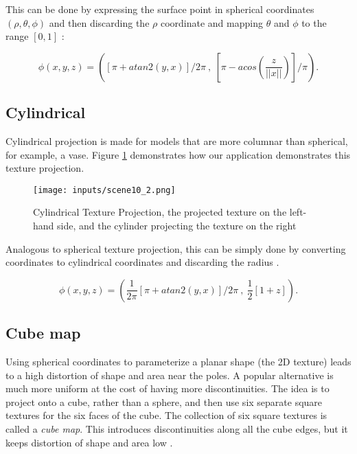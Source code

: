 \documentclass[cic,tc,english]{iiufrgs}
\begin{document}
This can be done by expressing the surface point in spherical coordinates $(\rho, \theta, \phi)$ and then discarding the $\rho$ coordinate and mapping $\theta$ and $\phi$ to the range $[0,1]$ \cite{Marschner2021CGFundamentals}:

\begin{equation}
    \phi(x,y,z) = ([\pi + atan2(y,x)]/2\pi\ ,\ [\pi - acos(\frac{z}{||x||})]/\pi).
\end{equation}

\subsection{Cylindrical}

Cylindrical projection is made for models that are more columnar than spherical, for example, a vase. Figure \ref{cylindricalltextureprojectiondemo} demonstrates how our application demonstrates this texture projection.

\begin{figure}[hbt!]
    \caption{Cylindrical Texture Projection, the projected texture on the left-hand side, and the cylinder projecting the texture on the right}
    \begin{center}
        \texttt{[image: inputs/scene10\_2.png]}
    \end{center}
    \label{cylindricalltextureprojectiondemo}
\end{figure}

Analogous to spherical texture projection, this can be simply done by converting coordinates to cylindrical coordinates and discarding the radius \cite{Marschner2021CGFundamentals}.

\begin{equation}
    \phi(x,y,z) = (\frac{1}{2\pi}[\pi + atan2(y,x)]/2\pi\ ,\ \frac{1}{2}[1 + z]).
\end{equation}

\subsection{Cube map}

Using spherical coordinates to parameterize a planar shape (the 2D texture) leads to a high distortion of shape and area near the poles. A popular alternative is much more uniform at the cost of having more discontinuities. The idea is to project onto a cube, rather than a sphere, and then use six separate square textures for the six faces of the cube. The collection of six square textures is called a \textit{cube map}. This introduces discontinuities along all the cube edges, but it keeps distortion of shape and area low \cite{Marschner2021CGFundamentals}.
\end{document}
